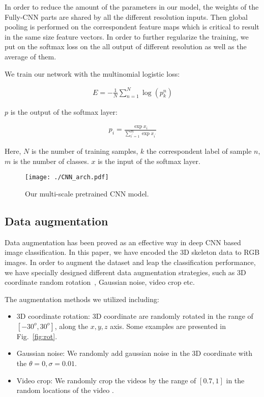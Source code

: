 \documentclass[10pt,journal]{IEEEtran}
\begin{document}
In order to reduce the amount of the parameters in our model, the weights of the Fully-CNN parts are shared by all the different resolution inputs. Then global pooling is performed on the correspondent feature maps which is critical to result in the same size feature vectors. In order to further regularize the training, we put on the softmax loss on the all output of different resolution as well as the average of them.

We train our network with the multinomial logistic loss:

\begin{equation}
\begin{aligned} 
E = -\frac{1}{N} \sum_{n=1}^N {\log(p_{k}^n)}
\end{aligned}
\end{equation}

\noindent $p$ is the output of the softmax layer:

\begin{equation}
\begin{aligned}
p_{i} = \frac {\exp{x_{i}}} {\sum_{i^{'}=1}^{m}{\exp{x_{i^{'}}}}}
\end{aligned}
\end{equation}

\noindent Here, $N$ is the number of training samples, $k$ the correspondent label of sample $n$, $m$ is the number of classes. $x$ is the input of the softmax layer.

\begin{figure}[htb]
\centering
\texttt{[image: ./CNN\_arch.pdf]}
\caption{Our multi-scale pretrained CNN model.}
\label{fig:multi-scale}
\end{figure}

\subsection{Data augmentation}
Data augmentation has been proved as an effective way in deep CNN based image classification. In this paper, we have encoded the 3D skeleton data to RGB images. In order to augment the dataset and leap the classification performance, we have specially designed different data augmentation strategies, such as 3D coordinate random rotation~\cite{Wang2016Action}, Gaussian noise, video crop etc.

The augmentation methods we utilized including:

\begin{itemize}

  \item 3D coordinate rotation: 3D coordinate are randomly rotated in the range of $[-30^o, 30^o]$, along the $x, y, z$ axis. Some examples are presented in Fig.~\ref{fig:rot}.

  \item Gaussian noise: We randomly add gaussian noise in the 3D coordinate with the $\theta = 0, \sigma = 0.01$. 

  \item Video crop: We randomly crop the videos by the range of $[0.7, 1]$ in the random locations of the video .

\end{itemize}
\end{document}
